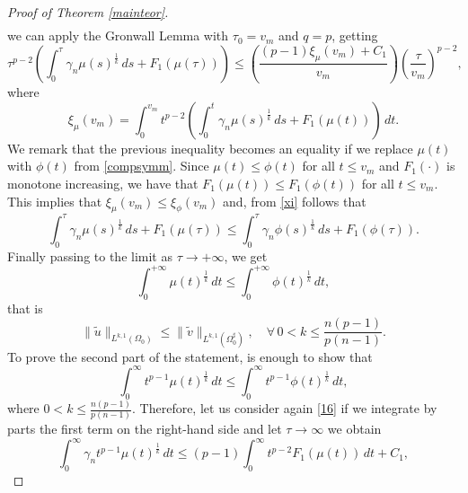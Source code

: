 \documentclass[12pt]{article}
\theoremstyle{definition}
\theoremstyle{plain}
\theoremstyle{definition}
\begin{document}
\begin{proof}[Proof of Theorem \ref{mainteor}]
\begin{equation*}
\begin{split}
   \end{split}
    \end{equation*}
    we can apply the Gronwall Lemma with $\tau_0=v_m$ and $q=p$, getting
    \begin{equation*}
        \tau^{p-2}\left(\int_0^\tau \gamma_n\mu(s)^\frac{1}{k}\,ds+F_1(\mu(\tau)) \right)\leq \left(\frac{(p-1)\xi_\mu(v_m)+C_1}{v_m}\right)\left(\frac{\tau}{v_m}\right)^{p-2},
    \end{equation*}
    where 
    \begin{equation}\label{xi}
        \xi_\mu(v_m)=\int_0^{v_m}t^{p-2}\left(\int_0^t\gamma_n\mu(s)^\frac{1}{k}\,ds+F_1(\mu(t))\right)\,dt.
    \end{equation}
    We remark that the previous inequality becomes an equality if we replace $\mu(t)$ with $\phi(t)$ from \eqref{compsymm}. Since $\mu(t)\leq\phi(t)$ for all $t\leq v_m$ and $F_1(\cdot)$ is monotone increasing, we have that $F_1(\mu(t))\leq F_1(\phi(t))$ for all $t\leq v_m$. This implies that $\xi_\mu(v_m)\leq\xi_\phi(v_m)$ and, from \eqref{xi} follows that 
    \begin{equation*}
        \int_0^\tau \gamma_n\mu(s)^\frac{1}{k}\,ds+F_1(\mu(\tau))\leq \int_0^\tau \gamma_n\phi(s)^\frac{1}{k}\,ds+F_1(\phi(\tau)).
    \end{equation*}
    Finally passing to the limit as $\tau\rightarrow+\infty$, we get
    \begin{equation*}
        \int_0^{+\infty}\mu(t)^\frac{1}{k}\,dt\leq \int_0^{+\infty}\phi(t)^\frac{1}{k}\,dt,
    \end{equation*}
    that is
    \begin{equation*}
        \|\tilde u\|_{L^{k,1}(\Omega_0)}\leq \|\tilde v\|_{L^{k,1}(\Omega_0^\sharp)}, \quad\forall\,0<k\leq\frac{n(p-1)}{p(n-1)}.
    \end{equation*}
    To prove the second part of the statement, is enough to show that
    \begin{equation*}
        \int_0^\infty t^{p-1}\mu(t)^\frac{1}{k}\,dt\leq\int_0^\infty t^{p-1}\phi(t)^\frac{1}{k}\,dt,
    \end{equation*}
    where $0<k\leq\frac{n(p-1)}{p(n-1)}$. Therefore, let us consider again \eqref{16} if we integrate by parts the first term on the right-hand side and let $\tau\to\infty$ we obtain
    \begin{equation*}
        \int_0^\infty\gamma_nt^{p-1}\mu(t)^\frac{1}{k}\,dt\leq(p-1)\int_0^\infty t^{p-2}F_1(\mu(t))\,dt+C_1,
    \end{equation*}

\end{proof}
\end{document}
